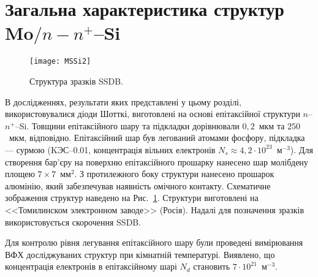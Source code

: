 \section{Загальна характеристика структур Mo$/n-n^+$--Si\label{SSDB:Struc}}



\begin{figure}[b]
\center
\texttt{[image: MSSi2]}%
\caption{\label{figMSSi2}
Структура зразків SSDB.
}
\end{figure}


В дослідженнях, результати яких представлені у цьому розділі, використовувалися діоди Шотткі, виготовлені на основі епітаксійної
структури $n$--$n^+$--Si.
Товщини епітаксійного шару та підкладки дорівнювали $0,2$~мкм та $250$~мкм, відповідно.
Епітаксійний шар був легований атомами фосфору, підкладка --- сурмою
(KЭС--0.01, концентрація вільних електронів $N_s\approx4,2\cdot10^{23}$~м$^{-3}$).
Для створення бар'єру на поверхню епітаксійного прошарку нанесено шар молібдену площею $7\times7$~мм$^2$.
З протилежного боку структури нанесено прошарок алюмінію, який забезпечував наявність омічного контакту.
Схематичне зображення структур наведено на Рис.~\ref{figMSSi2}.
Структури виготовлені на <<Томилинском электронном заводе>>  (Росія).
Надалі для позначення зразків використовується скорочення SSDB.

Для контролю рівня легування епітаксійного шару були проведені
вимірювання ВФХ досліджуваних структур при кімнатній температурі.
Виявлено, що концентрація електронів в епітаксійному шарі $N_d$ становить $7\cdot10^{21}$~м$^{-3}$.



